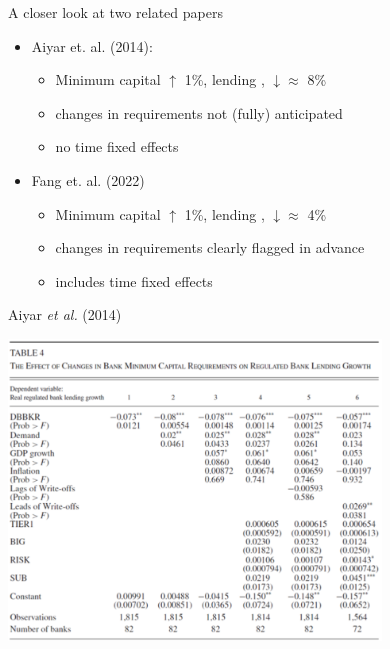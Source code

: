 \documentclass[
  14,
  ignorenonframetext,
  aspectratio=141,
]{beamer}
\begin{document}
\begin{frame}{A closer look at two related papers}
\protect\hypertarget{a-closer-look-at-two-related-papers}{}
\begin{itemize}
    \item Aiyar et. al. (2014):
    \begin{itemize}
        \item Minimum capital $\uparrow$ 1\%, lending , $\downarrow \approx$ 8\% 
        \item changes in requirements not (fully) anticipated
        \item no time fixed effects
    \end{itemize}
    \item Fang et. al. (2022)
    \begin{itemize}
        \item Minimum capital $\uparrow$ 1\%, lending , $\downarrow \approx$ 4\% 
        \item changes in requirements clearly flagged in advance
        \item includes time fixed effects
    \end{itemize}
\end{itemize}
\end{frame}

\begin{frame}{Aiyar \emph{et al.} (2014)}
\protect\hypertarget{aiyar2014international}{}
\centering

\includegraphics[width=\textwidth, height = 8cm]{AiyarEtAl_JMCB_2014_Table4}
\end{frame}
\end{document}
